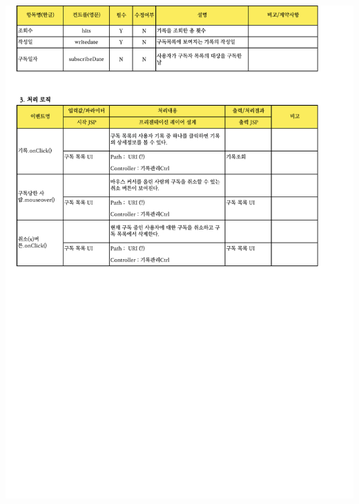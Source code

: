 {{{{{{{{{{{{{{{{{{{{{{{\includegraphics[width=20cm]{./Figure/Analysis/Display/diary/diary_22.pdf} \\
}}}}}}}}}}}}}}}}}}}}}}}
